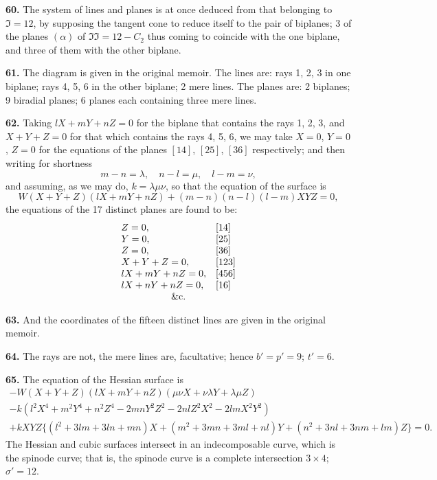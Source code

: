 \documentclass[11pt,a4paper]{article}
\theoremstyle{definition}
\begin{document}
\textbf{60.} The system of lines and planes is at once deduced from that belonging to $\mathfrak{I} = 12$, by supposing the tangent cone to reduce itself to the pair of biplanes; 3 of the planes $(\alpha)$ of $\mathfrak{II} = 12 - C_2$ thus coming to coincide with the one biplane, and three of them with the other biplane.

\textbf{61.} The diagram is given in the original memoir. The lines are: rays 1, 2, 3 in one biplane; rays 4, 5, 6 in the other biplane; 2 mere lines. The planes are: 2 biplanes; 9 biradial planes; 6 planes each containing three mere lines.

\textbf{62.} Taking $lX + mY + nZ = 0$ for the biplane that contains the rays 1, 2, 3, and $X + Y + Z = 0$ for that which contains the rays 4, 5, 6, we may take $X = 0$, $Y = 0$, $Z = 0$ for the equations of the planes $[14]$, $[25]$, $[36]$ respectively; and then writing for shortness
\[
m - n = \lambda, \quad n - l = \mu, \quad l - m = \nu,
\]
and assuming, as we may do, $k = \lambda\mu\nu$, so that the equation of the surface is
\[
W(X + Y + Z)(lX + mY + nZ) + (m - n)(n - l)(l - m)XYZ = 0,
\]
the equations of the 17 distinct planes are found to be:
\[
\begin{array}{ll}
Z = 0, & [14] \\
Y = 0, & [25] \\
Z = 0, & [36] \\
X + Y + Z = 0, & [123] \\
lX + mY + nZ = 0, & [456] \\
lX + nY + nZ = 0, & [16] \\
\multicolumn{2}{c}{\text{\&c.}}
\end{array}
\]

\textbf{63.} And the coordinates of the fifteen distinct lines are given in the original memoir.

\textbf{64.} The rays are not, the mere lines are, facultative; hence $b' = p' = 9$; $t' = 6$.

\textbf{65.} The equation of the Hessian surface is
\begin{multline*}
-W(X + Y + Z)(lX + mY + nZ)(\mu\nu X + \nu\lambda Y + \lambda\mu Z) \\
- k(l^2X^4 + m^2Y^4 + n^2Z^4 - 2mnY^2Z^2 - 2nlZ^2X^2 - 2lmX^2Y^2) \\
+ kXYZ\{(l^2 + 3lm + 3ln + mn)X + (m^2 + 3mn + 3ml + nl)Y + (n^2 + 3nl + 3nm + lm)Z\} = 0.
\end{multline*}
The Hessian and cubic surfaces intersect in an indecomposable curve, which is the spinode curve; that is, the spinode curve is a complete intersection $3 \times 4$; $\sigma' = 12$.
\end{document}
